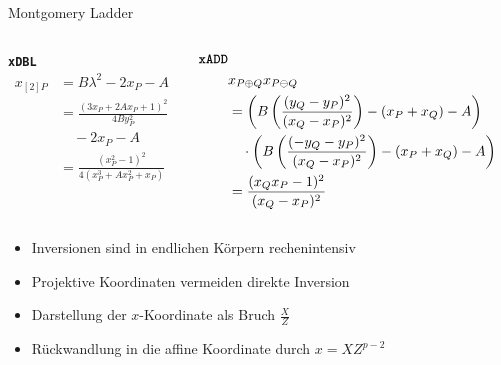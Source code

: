 \begin{frame}{Montgomery Ladder}
    \begin{columns}
    \begin{column}{0.5\textwidth}
        \textbf{\texttt{xDBL}}\\
    \vspace{-1.8em}
    \begin{align*}
        x_{[2]P}&=B\lambda^2-2x_P-A\\
        &=\frac{(3x_P+2Ax_P+1)^2}{4By^2_P}\\&\quad-2x_P-A\\
        &=\frac{(x_P^2-1)^2}{4(x_P^3+Ax_P^2+x_P)}
    \end{align*}
    \end{column}
    \begin{column}{0.5\linewidth}
    \begin{align*}
        \textbf{\texttt{xADD}}\\
        &x_{P\oplus Q} x_{P\ominus Q}\\
        &= \left(B\left(\frac{(y_Q - y_P)^2}{(x_Q - x_P)^2}\right)  - (x_P + x_Q)-A\right)\\
        &\quad\cdot\left(B\left(\frac{(-y_Q - y_P)^2}{(x_Q - x_P)^2}\right)  - (x_P + x_Q)-A\right)\\
        &=  \frac{(x_Qx_P-1)^2}{(x_Q-x_P)^2}
    \end{align*}
    \end{column}
        
    \end{columns}
    \begin{itemize}
        \item Inversionen sind in endlichen Körpern rechenintensiv
        \item Projektive Koordinaten vermeiden direkte Inversion
        \item Darstellung der $x$-Koordinate als Bruch $\frac{X}{Z}$
        \item Rückwandlung in die affine Koordinate durch $x=XZ^{p-2}$
    \end{itemize}
    
\end{frame}

